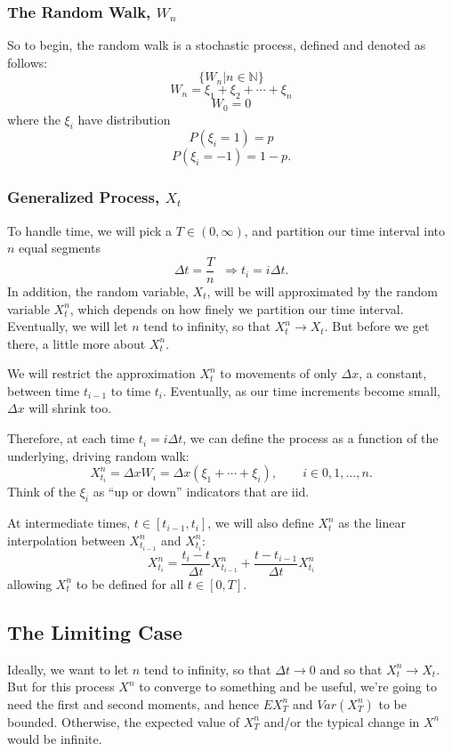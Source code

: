 \documentclass[12pt]{article}
\theoremstyle{plain}
\theoremstyle{definition}
\theoremstyle{remark}
\begin{document}
\subsubsection{The Random Walk, $W_n$}
So to begin, the random walk is a stochastic process, defined and denoted
as follows:
   \[ \{ W_n | n \in \mathbb{N} \} \]
   \[ W_n = \xi_1 + \xi_2 + \cdots + \xi_n \]
   \[ W_0 =  0 \]
where the $\xi_i$ have distribution
   \[ P(\xi_i = 1) = p \]
   \[ P(\xi_i = -1) = 1-p. \]

\subsubsection{Generalized Process, $X_t$}
To handle time, we will pick a $T \in (0, \infty)$, and partition our
time interval into $n$ equal segments
   \[ \Delta t = \frac{T}{n} \;\; \Rightarrow t_i = i \Delta t.\]
In addition, the random variable, $X_t$, will be will approximated by
the random variable $X^n_t$, which depends on how finely we partition
our time interval.  Eventually, we will let $n$ tend to infinity, so
that $X^n_t \rightarrow X_t$. But before we get there, a little more
about $X^n_t$.

We will restrict the approximation $X^n_t$ to movements of
only $\Delta x$, a constant, between time $t_{i-1}$ to time $t_i$.
Eventually, as our time increments become small, $\Delta x$ will
shrink too.

Therefore, at each time $t_i =  i \Delta  t $, we can define the process
as a function of the underlying, driving random walk:
\begin{equation}
   \label{bm1}
   X^n_{t_i} = \Delta x W_i = \Delta x (\xi_1 + \cdots + \xi_i),
      \qquad i \in 0,1,\ldots,n.
\end{equation}
Think of the $\xi_i$ as ``up or down'' indicators that are iid.

At intermediate times, $t \in [t_{i-1},t_i]$, we will also define $X^n_t$ as
the linear interpolation between $X^n_{t_{i-1}}$ and  $X^n_{t_{i}}$:
\[ X^n_{t_{i}} = \frac{t_i - t}{\Delta t} X^n_{t_{i-1}} +
   \frac{t- t_{i -1}} {\Delta t} X^n_{t_{i}} \]
allowing $X_t^n$ to be defined for all $t \in [0,T]$.

\subsection{The Limiting Case}

Ideally, we want to let $n$ tend to infinity, so that $\Delta t
\rightarrow 0$ and so that $X^n_t \rightarrow X_t$.  But for this process
$X^n$ to converge to something and be useful, we're going to need the
first and second moments, and hence $EX^n_T$ and $Var(X^n_T)$ to be
bounded. Otherwise, the expected value of $X^n_T$ and/or the
typical change in $X^n$ would be infinite.
\end{document}
